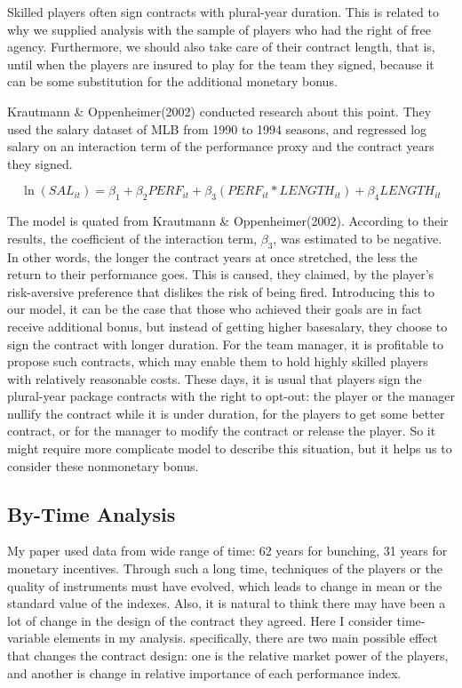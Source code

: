 \documentclass[dvipdfmx, 12pt]{article}
\begin{document}
Skilled players often sign contracts with plural-year duration. This is related to why we supplied analysis with the sample of players who had the right of free agency. Furthermore, we should also take care of their contract length, that is, until when the players are insured to play for the team they signed, because it can be some substitution for the additional monetary bonus.

Krautmann \& Oppenheimer(2002) conducted research about this point. They used the salary dataset of MLB from 1990 to 1994 seasons, and regressed log salary on an interaction term of the performance proxy and the contract years they signed.

\[
\ln(SAL_{it}) = \beta_1 + \beta_2 PERF_{it} + \beta_3 (PERF_{it} * LENGTH_{it})+ \beta_4 LENGTH_{it}
\]

The model is quated from Krautmann \& Oppenheimer(2002). According to their results, the coefficient of the interaction term, $\beta_3$, was estimated to be negative. In other words, the longer the contract years at once stretched, the less the return to their performance goes. This is caused, they claimed, by the player's risk-aversive preference that dislikes the risk of being fired. Introducing this to our model, it can be the case that those who achieved their goals are in fact receive additional bonus, but instead of getting higher basesalary, they choose to sign the contract with longer duration. For the team manager, it is profitable to propose such contracts, which may enable them to hold highly skilled players with relatively reasonable costs. These days, it is usual that players sign the plural-year package contracts with the right to opt-out: the player or the manager nullify the contract while it is under duration, for the players to get some better contract, or for the manager to modify the contract or release the player. So it might require more complicate model to describe this situation, but it helps us to consider these nonmonetary bonus.

\subsection{By-Time Analysis}

My paper used data from wide range of time: 62 years for bunching, 31 years for monetary incentives. Through such a long time, techniques of the players or the quality of instruments must have evolved, which leads to change in mean or the standard value of the indexes. Also, it is natural to think there may have been a lot of change in the design of the contract they agreed. Here I consider time-variable elements in my analysis. specifically, there are two main possible effect that changes the contract design: one is the relative market power of the players, and another is change in relative importance of each performance index.
\end{document}
